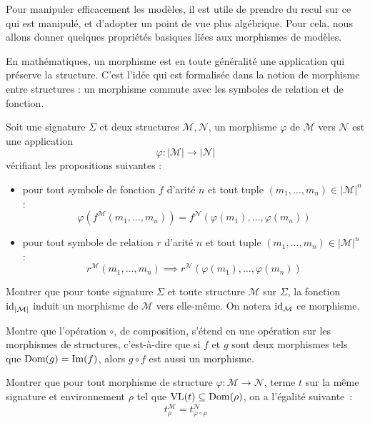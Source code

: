 Pour manipuler efficacement les modèles, il est utile de prendre du recul sur ce
qui est manipulé, et d'adopter un point de vue plus algébrique. Pour cela, nous
allons donner quelques propriétés basiques liées aux morphismes de modèles.

En mathématiques, un morphisme est en toute généralité une application qui
préserve la structure. C'est l'idée qui est formalisée dans la notion de
morphisme entre structures : un morphisme commute avec les symboles de relation
et de fonction.

\begin{definition}
  Soit une signature $\Sigma$ et deux structures $\mathcal M,\mathcal N$, un
  morphisme $\varphi$ de $\mathcal M$ vers $\mathcal N$ est une application
  \[\varphi : |\mathcal M|\longrightarrow |\mathcal N|\]
  vérifiant les propositions suivantes :
  \begin{itemize}
  \item pour tout symbole de fonction $f$ d'arité $n$ et tout tuple
    $(m_1,\ldots,m_n)\in|\mathcal M|^n$ :
    \[\varphi(f^{\mathcal M}(m_1,\ldots,m_n))
    = f^{\mathcal N}(\varphi(m_1),\ldots,\varphi(m_n))\]
  \item pour tout symbole de relation $r$ d'arité $n$ et tout tuple
    $(m_1,\ldots,m_n)\in|\mathcal M|^n$ :
    \[r^{\mathcal M}(m_1,\ldots,m_n) \implies
    r^{\mathcal N}(\varphi(m_1),\ldots,\varphi(m_n)) \]
  \end{itemize}
\end{definition}

\begin{exercise}
  Montrer que pour toute signature $\Sigma$ et toute structure $\mathcal M$ sur
  $\Sigma$, la fonction $\operatorname{id}_{|\mathcal M|}$ induit un morphisme de $\mathcal M$
  vers elle-même. On notera $\operatorname{id}_\mathcal M$ ce morphisme.
\end{exercise}

\begin{exercise}
  Montre que l'opération $\circ$, de composition, s'étend en une opération sur
  les morphismes de structures, c'est-à-dire que si $f$ et $g$ sont deux
  morphismes tels que $\operatorname{Dom}(g) = \operatorname{Im}(f)$, alors $g\circ f$ est aussi un
  morphisme.
\end{exercise}

\begin{exercise}\label{pred.exo.morph.val}
  Montrer que pour tout morphisme de structure
  $\varphi : \mathcal M \to \mathcal N$, terme $t$ sur la même signature et
  environnement $\rho$ tel que $\operatorname{VL}(t) \subseteq \operatorname{Dom}(\rho)$, on a l'égalité
  suivante~:
  \[t_\rho^\mathcal M = t_{\varphi\circ\rho}^\mathcal N\]
\end{exercise}

